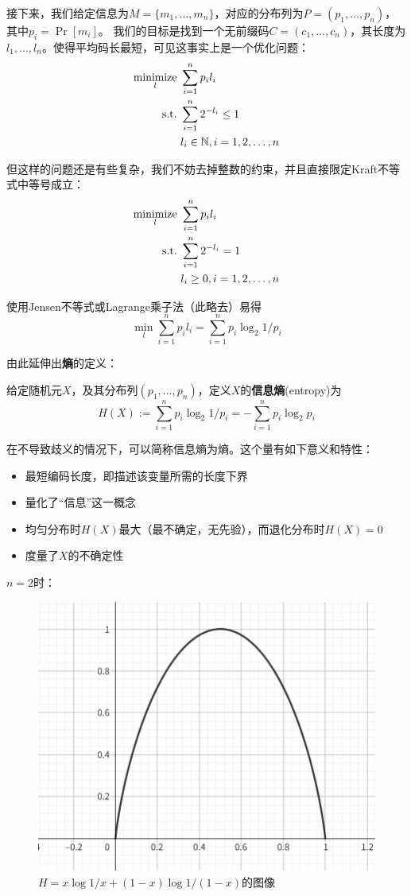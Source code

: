 接下来，我们给定信息为$M = \{m_1, \dots, m_n\}$，对应的分布列为$P = (p_1, \dots, p_n)$，其中$p_i = \Pr[m_i]$。 我们的目标是找到一个无前缀码$C = (c_1,\dots, c_n)$，其长度为$l_1,\dots,l_n$。使得平均码长最短，可见这事实上是一个优化问题：
\begin{align*}
    \operatorname*{minimize}_l \ & \sum_{i=1}^n p_i l_i  \\
    \text{s.t.} \ & \sum_{i=1}^n 2^{-l_i} \le 1\\
    & l_i \in \mathbb{N} , i=1,2,\dots,n
\end{align*}

但这样的问题还是有些复杂，我们不妨去掉整数的约束，并且直接限定Kraft不等式中等号成立：
\begin{align*}
    \operatorname*{minimize}_l \ & \sum_{i=1}^n p_i l_i  \\
    \text{s.t.} \ & \sum_{i=1}^n 2^{-l_i} = 1\\
    & l_i \ge 0 , i=1,2,\dots,n
\end{align*}

使用Jensen不等式或Lagrange乘子法（此略去）易得 
\[
\min_l \sum_{i=1}^n p_i l_i = \sum_{i=1}^n p_i \log_2 1/p_i
\]

由此延伸出\textbf{熵}的定义：
\begin{definition}[熵]
    给定随机元$X$，及其分布列$(p_1, \dots, p_n)$，定义$X$的\textbf{信息熵}(entropy)为 
    \[
    H(X) := \sum_{i=1}^n p_i \log_2 1/p_i = - \sum_{i=1}^n p_i \log_2 p_i
    \]
\end{definition}

在不导致歧义的情况下，可以简称信息熵为熵。这个量有如下意义和特性：
\begin{itemize}
    \item 最短编码长度，即描述该变量所需的长度下界
    \item 量化了“信息”这一概念
    \item 均匀分布时$H(X)$最大（最不确定，无先验），而退化分布时$H(X)=0$ 
    \item 度量了$X$的不确定性
\end{itemize}

$n=2$时：
\begin{figure}[H]
    \centering
    \includegraphics[width=.6\textwidth]{images/c2_1.png}
    \caption{$H=x\log 1/x + (1-x)\log 1/(1-x)$的图像}
\end{figure}
